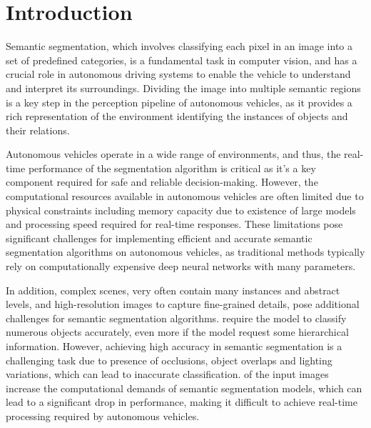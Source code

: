 \section{Introduction}

  Semantic segmentation, which involves classifying each pixel in an image
  into a set of predefined categories, is a fundamental task in computer vision,
  and has a crucial role in autonomous driving systems to enable the vehicle
  to understand and interpret its surroundings. Dividing the image into multiple
  semantic regions is a key step in the perception pipeline of autonomous vehicles,
  as it provides a rich representation of the environment identifying the instances
  of objects and their relations.


  Autonomous vehicles operate in a wide range of environments, and thus, the real-time
  performance of the segmentation algorithm is critical as it's a key component required
  for safe and reliable decision-making. However, the computational resources available
  in autonomous vehicles are often limited due to physical constraints including memory capacity
  due to existence of large models and processing speed required for real-time responses.
  These limitations pose significant challenges for implementing efficient and accurate
  semantic segmentation algorithms on autonomous vehicles, as traditional methods typically
  rely on computationally expensive deep neural networks with many parameters.

  In addition, complex scenes, very often contain many instances and abstract
  levels, and high-resolution images to capture fine-grained details, pose
  additional challenges for semantic segmentation algorithms.  require
  the model to classify numerous objects accurately, even more
  if the model request some hierarchical information. However, achieving
  high accuracy in semantic segmentation is a challenging task due to presence of occlusions,
  object overlaps and lighting variations, which can lead to inaccurate classification. 
  of the input images increase the computational demands of semantic segmentation models, which
  can lead to a significant drop in performance, making it difficult to achieve real-time processing
  required by autonomous vehicles.

